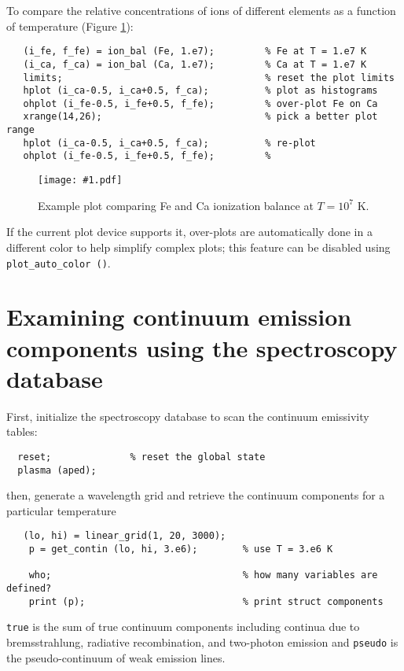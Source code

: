 \documentclass{book}
\newcommand{\putfig}[1]{\texttt{[image: \#1.pdf]}}
\newcommand{\putfig}[1]{\psfig{file=#1.ps}}
\begin{document}
{To compare the relative concentrations of ions of different elements
as a function of temperature (Figure \ref{fig:ion_bal}):

\begin{verbatim}
   (i_fe, f_fe) = ion_bal (Fe, 1.e7);         % Fe at T = 1.e7 K
   (i_ca, f_ca) = ion_bal (Ca, 1.e7);         % Ca at T = 1.e7 K
   limits;                                    % reset the plot limits
   hplot (i_ca-0.5, i_ca+0.5, f_ca);          % plot as histograms
   ohplot (i_fe-0.5, i_fe+0.5, f_fe);         % over-plot Fe on Ca
   xrange(14,26);                             % pick a better plot range
   hplot (i_ca-0.5, i_ca+0.5, f_ca);          % re-plot
   ohplot (i_fe-0.5, i_fe+0.5, f_fe);         %
\end{verbatim}

\begin{figure}[ht]
\putfig{figures/ion_bal}
\caption{Example plot comparing Fe and Ca ionization balance at $T = 10^7$ K.}
\label{fig:ion_bal}
\end{figure}

If the current plot device supports it, over-plots are automatically done
in a different color to help simplify complex plots; this feature can be
disabled using {\tt plot\_auto\_color ()}.

\section{Examining continuum emission components using the spectroscopy
database}

First, initialize the spectroscopy database to scan the continuum
emissivity tables:
 \begin{verbatim}
  reset;              % reset the global state
  plasma (aped);
 \end{verbatim}
then, generate a wavelength grid and retrieve the continuum components
for a particular temperature
\begin{verbatim}
   (lo, hi) = linear_grid(1, 20, 3000);
    p = get_contin (lo, hi, 3.e6);        % use T = 3.e6 K

    who;                                  % how many variables are defined?
    print (p);                            % print struct components
\end{verbatim}
{\tt true} is the sum of true continuum components including
continua due to bremsstrahlung, radiative recombination, and
two-photon emission and {\tt pseudo} is the pseudo-continuum of weak
emission lines.

}
\end{document}
